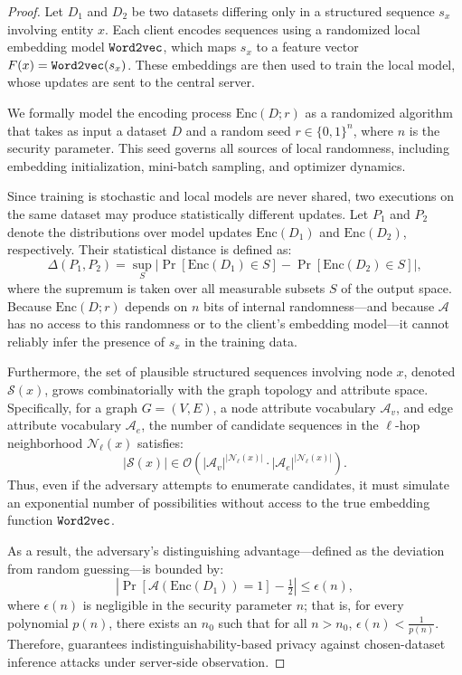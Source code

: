 \begin{proof}
    Let \(D_1\) and \(D_2\) be two datasets differing only in a structured sequence \(s_x\) involving entity \(x\). Each client encodes sequences using a randomized local embedding model \(\texttt{Word2vec}\), which maps \(s_x\) to a feature vector \(F(x) = \texttt{Word2vec}(s_x)\). These embeddings are then used to train the local model, whose updates are sent to the central server.

We formally model the encoding process \(\text{Enc}(D; r)\) as a randomized algorithm that takes as input a dataset \(D\) and a random seed \(r \in \{0,1\}^n\), where \(n\) is the security parameter. This seed governs all sources of local randomness, including embedding initialization, mini-batch sampling, and optimizer dynamics. 

Since training is stochastic and local models are never shared, two executions on the same dataset may produce statistically different updates. Let \(P_1\) and \(P_2\) denote the distributions over model updates \(\text{Enc}(D_1)\) and \(\text{Enc}(D_2)\), respectively. Their statistical distance is defined as:
\[
\Delta(P_1, P_2) = \sup_{S} \left| \Pr[\text{Enc}(D_1) \in S] - \Pr[\text{Enc}(D_2) \in S] \right|,
\]
where the supremum is taken over all measurable subsets \(S\) of the output space. Because \(\text{Enc}(D; r)\) depends on \(n\) bits of internal randomness—and because \(\mathcal{A}\) has no access to this randomness or to the client’s embedding model—it cannot reliably infer the presence of \(s_x\) in the training data.

Furthermore, the set of plausible structured sequences involving node \(x\), denoted \(\mathcal{S}(x)\), grows combinatorially with the graph topology and attribute space. Specifically, for a graph \(G = (V, E)\), a node attribute vocabulary \(\mathcal{A}_v\), and edge attribute vocabulary \(\mathcal{A}_e\), the number of candidate sequences in the \(\ell\)-hop neighborhood \(\mathcal{N}_\ell(x)\) satisfies:
\[
|\mathcal{S}(x)| \in \mathcal{O}\left(|\mathcal{A}_v|^{|\mathcal{N}_\ell(x)|} \cdot |\mathcal{A}_e|^{|\mathcal{N}_\ell(x)|}\right).
\]
Thus, even if the adversary attempts to enumerate candidates, it must simulate an exponential number of possibilities without access to the true embedding function \(\texttt{Word2vec}\).

As a result, the adversary’s distinguishing advantage—defined as the deviation from random guessing—is bounded by:
\[
\left| \Pr[\mathcal{A}(\text{Enc}(D_1)) = 1] - \tfrac{1}{2} \right| \leq \epsilon(n),
\]
where \(\epsilon(n)\) is negligible in the security parameter \(n\); that is, for every polynomial \(p(n)\), there exists an \(n_0\) such that for all \(n > n_0\), \(\epsilon(n) < \frac{1}{p(n)}\). Therefore, \Sys guarantees indistinguishability-based privacy against chosen-dataset inference attacks under server-side observation.
\end{proof}


